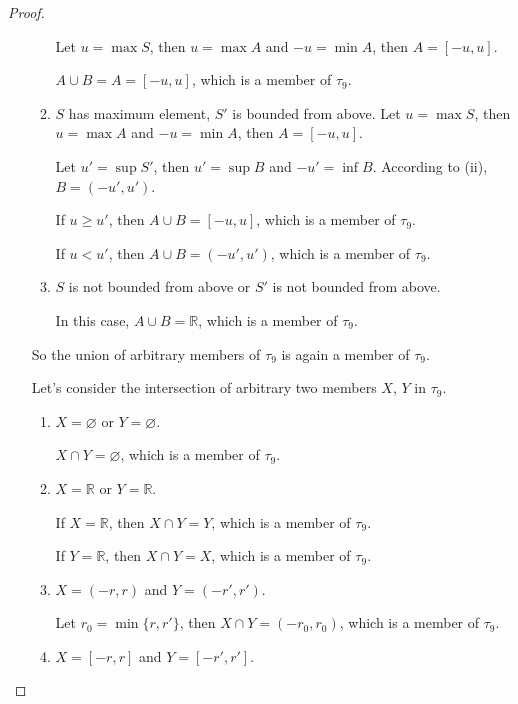 \begin{proof}
\begin{enumerate}[label={(\roman*)}]
\begin{enumerate}[label={\textbf{Case \arabic*.}},itemindent=1cm]
                        Let $u = \max S$, then $u = \max A$ and $-u = \min A$, then $A = [-u, u]$.

                        $A\cup B = A = [-u, u]$, which is a member of $\tau_{9}$.
                  \item $S$ has maximum element, $S'$ is bounded from above.
                        Let $u = \max S$, then $u = \max A$ and $-u = \min A$, then $A = [-u, u]$.

                        Let $u' = \sup S'$, then $u' = \sup B$ and $-u' = \inf B$. According to (ii), $B = (-u', u')$.

                        If $u\geq u'$, then $A\cup B = [-u, u]$, which is a member of $\tau_{9}$.

                        If $u < u'$, then $A\cup B = (-u', u')$, which is a member of $\tau_{9}$.
                  \item $S$ is not bounded from above or $S'$ is not bounded from above.

                        In this case, $A\cup B = \mathbb{R}$, which is a member of $\tau_{9}$.
              \end{enumerate}

              So the union of arbitrary members of $\tau_{9}$ is again a member of $\tau_{9}$.

              Let's consider the intersection of arbitrary two members $X$, $Y$ in $\tau_{9}$.
              \begin{enumerate}[label={\textbf{Case \arabic*.}},itemindent=1cm]
                  \item $X = \varnothing$ or $Y = \varnothing$.

                        $X\cap Y = \varnothing$, which is a member of $\tau_{9}$.
                  \item $X = \mathbb{R}$ or $Y = \mathbb{R}$.

                        If $X = \mathbb{R}$, then $X\cap Y = Y$, which is a member of $\tau_{9}$.

                        If $Y = \mathbb{R}$, then $X\cap Y = X$, which is a member of $\tau_{9}$.
                  \item $X = (-r, r)$ and $Y = (-r', r')$.

                        Let $r_{0} = \min\{ r, r' \}$, then $X\cap Y = (-r_{0}, r_{0})$, which is a member of $\tau_{9}$.
                  \item $X = [-r, r]$ and $Y = [-r', r']$.


\end{enumerate}
\end{enumerate}
\end{proof}
